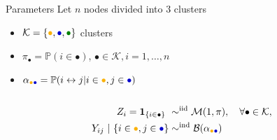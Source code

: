 \documentclass[compress,10pt]{beamer}
\begin{document}
\begin{frame}
\begin{center}
\begin{overlayarea}{\textwidth}{.5\textheight}
\begin{columns}
        \begin{column}{.5\paperwidth}
          \begin{small}
            \begin{block}{Parameters}
              Let $n$ nodes divided into $3$ clusters
              \begin{itemize}
              \item
                $\mathcal{K}=\{\textcolor{yellow!40!orange}{\bullet},\textcolor{blue!80!black}{\bullet},\textcolor{green!50!black}{\bullet}\}$
                 clusters
              \item  $\pi_\bullet  =  \mathbb{P}(i  \in  \bullet)$,
                $\bullet\in\mathcal{K},i=1,\dots,n$
              \item      $\alpha_{\textcolor{yellow!40!orange}{\bullet}\textcolor{blue!80!black}{\bullet}}     =      \mathbb{P}(i
                \leftrightarrow j | i\in\textcolor{yellow!40!orange}{\bullet},j\in\textcolor{blue!80!black}{\bullet})$
              \end{itemize}
            \end{block}
          \end{small}
        \end{column}
      \end{columns}
    \end{overlayarea}
  \end{center}
  

\begin{align*}
Z_i = \mathbf{1}_{\{i \in \bullet\}}  \ & \sim^{\text{iid}} \mathcal{M}(1,\pi), \quad \forall\bullet \in \mathcal{K}, \\ 
Y_{ij} \ | \ \{i\in\textcolor{yellow!40!orange}{\bullet},j\in\textcolor{blue!80!black}{\bullet}\}
& \sim^{\text{ind}} \mathcal{B}(\alpha_{\textcolor{yellow!40!orange}{\bullet}\textcolor{blue!80!black}{\bullet}})\\
\end{align*}

\end{frame}
\end{document}
